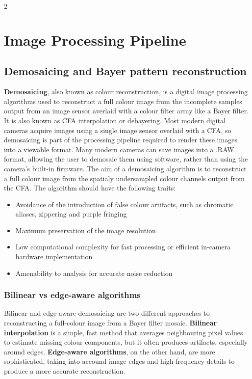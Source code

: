 \documentclass[10pt]{article}
\begin{document}
\begin{multicols}{2}

\section{Image Processing Pipeline}

\subsection{Demosaicing and Bayer pattern reconstruction}
\textbf{Demosaicing}, also known as colour reconstruction, is a digital image processing algorithms used to reconstruct a full colour image from the incomplete samples output from an image sensor averlaid with a colour filter array like a Bayer filter. It is also known as CFA interpolation or debayering.
\newline \newline
Most modern digital cameras acquire images using a single image sensor overlaid with a CFA, so demosaicing is part of the processing pipeline required to render these images into a viewable format. Many modern cameras can save images into a .RAW format, allowing the user to demosaic them using software, rather than using the camera's built-in firmware.
\newline \newline
The aim of a demosaicing algorithm is to reconstruct a full colour image from the spatialy undersampled colour channels output from the CFA. The algorithm should have the following traits:
\begin{itemize}
    \item Avoidance of the introduction of false colour artifacts, such as chromatic aliases, zippering and purple fringing
    \item Maximum preservation of the image resolution
    \item Low computational complexity for fast processing or efficient in-camera hardware implementation
    \item Amenability to analysis for accurate noise reduction
\end{itemize}

\subsubsection{Bilinear vs edge-aware algorithms}
Bilinear and edge-aware demosaicing are two different approaches to reconstructing a full-colour image from a Bayer filter mosaic.
\newline \newline
\textbf{Bilinear interpolation} is a simple, fast method that averages neighbouring pixel values to estimate missing colour components, but it often produces artifacts, especially around edges.
\newline \newline
\textbf{Edge-aware algorithms}, on the other hand, are more sophisticated, taking into accound image edges and high-frequency details to produce a more accurate reconstruction.


\end{multicols}
\end{document}
